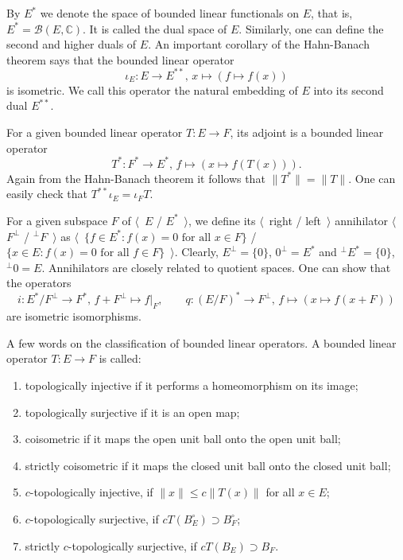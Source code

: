 By $E^*$ we denote the space of bounded linear functionals on $E$, that is,
$E^*=\mathcal{B}(E, \mathbb{C})$. It is called the dual space of $E$. Similarly,
one can define the second and higher duals of $E$. An important corollary of the
Hahn-Banach theorem says that the bounded linear operator 
\[
\iota_E:E\to E^{**},\,x\mapsto (f\mapsto f(x))
\] 
is isometric. We call this operator the natural embedding of $E$ into its 
second dual $E^{**}$.

For a given bounded linear operator $T:E\to F$, its adjoint is a bounded linear 
operator 
\[
T^*:F^*\to E^*,\,f\mapsto (x\mapsto f(T(x))).
\]
Again from the Hahn-Banach 
theorem it follows that $\lVert T^*\rVert=\lVert T\rVert$. One can easily check 
that $T^{**}\iota_E=\iota_F T$.  

For a given subspace $F$ of $\langle$~$E$ / $E^*$~$\rangle$, we define 
its $\langle$~right / left~$\rangle$ annihilator 
$\langle$~$F^\perp$ / ${}^\perp F$~$\rangle$ as 
$\langle$~$ \{ f\in E^*: f(x)=0 \text{ for all } x\in F \}$ / 
$ \{ x\in E : f(x)=0 \text{ for all } f\in F \}$~$\rangle$. 
Clearly, $E^{\perp} = \{ 0\}$, $0^{\perp}=E^*$ 
and ${}^{\perp}E^*= \{ 0\}$, ${}^{\perp}0= E$. Annihilators are closely related
to quotient spaces. One can show that 
the operators 
\[
i: E^*/F^{\perp}\to F^*,\, f+F^\perp\mapsto f|_F,
\quad\quad 
q:{(E/F)}^*\to F^{\perp},\, f\mapsto (x\mapsto f(x + F))
\] 
are isometric isomorphisms.

A few words on the classification of bounded linear operators. A bounded linear
operator $T:E\to F$ is called:
\begin{enumerate}[label = (\roman*)]
  \item topologically injective if it performs a homeomorphism on its image;

  \item topologically surjective if it is an open map;

  \item coisometric if it maps the open unit ball onto the open unit ball;

  \item strictly coisometric if it maps the closed unit ball onto the closed unit ball; 

  \item $c$-topologically injective, if $\lVert x\rVert\leq c\lVert  T(x)\rVert$ for
  all $x\in E$;

  \item $c$-topologically surjective, if $cT(B_E^\circ)\supset B_F^\circ$;

  \item strictly $c$-topologically surjective, if $cT(B_E)\supset B_F$.
\end{enumerate}

